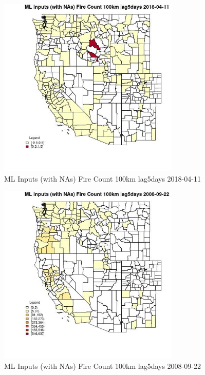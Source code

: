 \begin{figure} 
\centering  
\includegraphics[width=0.77\textwidth]{Code_Outputs/Report_ML_input_PM25_Step4_part_e_de_duplicated_aves_compiled_2019-05-18wNAs_CountyFire_Count_100km_lag5daysMean2018-04-11.jpg} 
\caption{\label{fig:Report_ML_input_PM25_Step4_part_e_de_duplicated_aves_compiled_2019-05-18wNAsCountyFire_Count_100km_lag5daysMean2018-04-11}ML Inputs (with NAs) Fire Count 100km lag5days 2018-04-11} 
\end{figure} 
 

\begin{figure} 
\centering  
\includegraphics[width=0.77\textwidth]{Code_Outputs/Report_ML_input_PM25_Step4_part_e_de_duplicated_aves_compiled_2019-05-18wNAs_CountyFire_Count_100km_lag5daysMean2008-09-22.jpg} 
\caption{\label{fig:Report_ML_input_PM25_Step4_part_e_de_duplicated_aves_compiled_2019-05-18wNAsCountyFire_Count_100km_lag5daysMean2008-09-22}ML Inputs (with NAs) Fire Count 100km lag5days 2008-09-22} 
\end{figure} 
 

